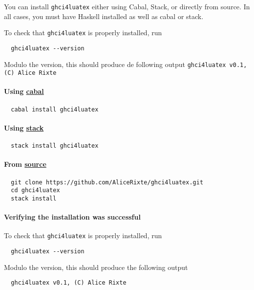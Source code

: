 \documentclass{article}
\begin{document}
You can install \texttt{ghci4luatex} either using Cabal, Stack, or directly from source. In all cases, you must have Haskell installed as well as cabal or stack.

To check that \texttt{ghci4luatex} is properly installed, run

\begin{verbatim}
  ghci4luatex --version
\end{verbatim}
Modulo the version, this should produce de following output \texttt{ghci4luatex v0.1, (C) Alice Rixte}

\paragraph{Using \href{https://www.haskell.org/cabal/}{cabal}}

\begin{verbatim}
  cabal install ghci4luatex
\end{verbatim}

\paragraph{Using \href{https://docs.haskellstack.org/en/stable/}{stack}}

\begin{verbatim}
  stack install ghci4luatex
\end{verbatim}

\paragraph{From  \href{https://github.com/AliceRixte/ghci4luatex/}{source}}

\begin{verbatim}
  git clone https://github.com/AliceRixte/ghci4luatex.git
  cd ghci4luatex
  stack install
\end{verbatim}

\paragraph{Verifying the installation was successful}
To check that \texttt{ghci4luatex} is properly installed, run

\begin{verbatim}
  ghci4luatex --version
\end{verbatim}
Modulo the version, this should produce the following output

\begin{verbatim}
  ghci4luatex v0.1, (C) Alice Rixte
\end{verbatim}
\end{document}
